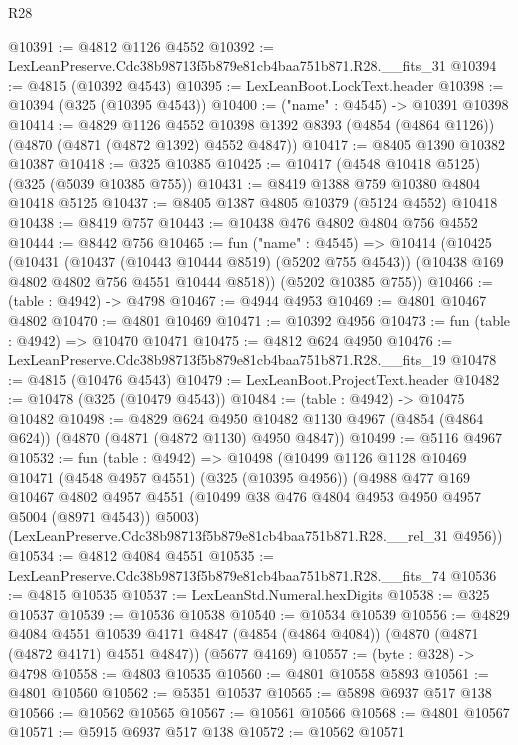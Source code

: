 \begin{lexlean}{R28}
\begin{coremodule}
@10391 := @4812 @1126 @4552
@10392 := LexLeanPreserve.Cdc38b98713f5b879e81cb4baa751b871.R28.__fits_31
@10394 := @4815 (@10392 @4543)
@10395 := LexLeanBoot.LockText.header
@10398 := @10394 (@325 (@10395 @4543))
@10400 := ("name" : @4545) -> @10391 @10398
@10414 := @4829
    @1126
    @4552
    @10398
    @1392
    @8393
    (@4854 (@4864 @1126))
    (@4870 (@4871 (@4872 @1392) @4552 @4847))
@10417 := @8405 @1390 @10382 @10387
@10418 := @325 @10385
@10425 := @10417 (@4548 @10418 @5125) (@325 (@5039 @10385 @755))
@10431 := @8419 @1388 @759 @10380 @4804 @10418 @5125
@10437 := @8405 @1387 @4805 @10379 (@5124 @4552) @10418
@10438 := @8419 @757
@10443 := @10438 @476 @4802 @4804 @756 @4552
@10444 := @8442 @756
@10465 := fun ("name" : @4545) =>
  @10414
    (@10425
      (@10431
        (@10437 (@10443 @10444 @8519) (@5202 @755 @4543))
        (@10438 @169 @4802 @4802 @756 @4551 @10444 @8518))
      (@5202 @10385 @755))
@10466 := (table : @4942) -> @4798
@10467 := @4944 @4953
@10469 := @4801 @10467 @4802
@10470 := @4801 @10469
@10471 := @10392 @4956
@10473 := fun (table : @4942) => @10470 @10471
@10475 := @4812 @624 @4950
@10476 := LexLeanPreserve.Cdc38b98713f5b879e81cb4baa751b871.R28.__fits_19
@10478 := @4815 (@10476 @4543)
@10479 := LexLeanBoot.ProjectText.header
@10482 := @10478 (@325 (@10479 @4543))
@10484 := (table : @4942) -> @10475 @10482
@10498 := @4829
    @624
    @4950
    @10482
    @1130
    @4967
    (@4854 (@4864 @624))
    (@4870 (@4871 (@4872 @1130) @4950 @4847))
@10499 := @5116 @4967
@10532 := fun (table : @4942) =>
  @10498
    (@10499
      @1126
      @1128
      @10469
      @10471
      (@4548 @4957 @4551)
      (@325 (@10395 @4956))
      (@4988
        @477
        @169
        @10467
        @4802
        @4957
        @4551
        (@10499 @38 @476 @4804 @4953 @4950 @4957 @5004 (@8971 @4543))
        @5003)
      (LexLeanPreserve.Cdc38b98713f5b879e81cb4baa751b871.R28.__rel_31 @4956))
@10534 := @4812 @4084 @4551
@10535 := LexLeanPreserve.Cdc38b98713f5b879e81cb4baa751b871.R28.__fits_74
@10536 := @4815 @10535
@10537 := LexLeanStd.Numeral.hexDigits
@10538 := @325 @10537
@10539 := @10536 @10538
@10540 := @10534 @10539
@10556 := @4829
    @4084
    @4551
    @10539
    @4171
    @4847
    (@4854 (@4864 @4084))
    (@4870 (@4871 (@4872 @4171) @4551 @4847))
    (@5677 @4169)
@10557 := (byte : @328) -> @4798
@10558 := @4803 @10535
@10560 := @4801 @10558 @5893
@10561 := @4801 @10560
@10562 := @5351 @10537
@10565 := @5898 @6937 @517 @138
@10566 := @10562 @10565
@10567 := @10561 @10566
@10568 := @4801 @10567
@10571 := @5915 @6937 @517 @138
@10572 := @10562 @10571

\end{coremodule}
\end{lexlean}
